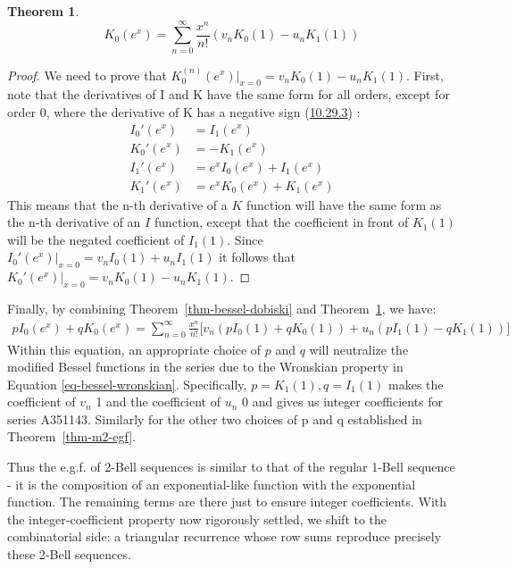 \documentclass[a4paper]{amsart}
\newtheorem{theorem}{Theorem}
\begin{document}
\begin{theorem}\label{thm-besselk-dobinski}
\[
K_0(e^x) = \sum_{n=0}^\infty \frac{x^n}{n!}(v_n K_0(1) - u_n K_1(1))
\]
\end{theorem}

\begin{proof}
We need to prove that $K_0^{(n)}(e^x)|_{x=0} = v_n K_0(1)-u_n K_1(1)$. First, note that the derivatives of I and K have the same form for all orders, except for order 0, where the derivative of K has a negative sign (\href{https://dlmf.nist.gov/10.29.E3}{10.29.3}) \cite{NIST:DLMF}:
\[
\begin{aligned}
I_0'(e^x) &= I_1(e^x) \\
K_0'(e^x) &= -K_1(e^x) \\
I_1'(e^x) &= e^x I_0(e^x) + I_1(e^x) \\
K_1'(e^x) &= e^x K_0(e^x) + K_1(e^x)
\end{aligned}
\]
This means that the n-th derivative of a $K$ function will have the same form as the n-th derivative of an $I$ function, except that the coefficient in front of $K_1(1)$ will be the negated coefficient of $I_1(1)$. Since $I_0'(e^x)|_{x=0} = v_n I_0(1) + u_n I_1(1)$ it follows that $K_0'(e^x)|_{x=0} = v_n K_0(1)-u_n K_1(1)$.
\end{proof}

Finally, by combining Theorem~\ref{thm-bessel-dobiski} and Theorem~\ref{thm-besselk-dobinski}, we have:
\[
\begin{aligned}
p I_0(e^x) + q K_0(e^x) = \sum_{n=0}^\infty \frac{x^n}{n!} \bigg[ v_n (p I_0(1) + q K_0(1)) + u_n (p I_1(1) - q K_1(1))\bigg]
\end{aligned}
\]
Within this equation, an appropriate choice of $p$ and $q$ will neutralize the modified Bessel functions in the series due to the Wronskian property in Equation \eqref{eq-bessel-wronskian}. Specifically, $p = K_1(1), q = I_1(1)$ makes the coefficient of $v_n$ 1 and the coefficient of $u_n$ 0 and gives us integer coefficients for series A351143. Similarly for the other two choices of p and q established in Theorem~\ref{thm-m2-egf}.

Thus the e.g.f. of 2-Bell sequences is similar to that of the regular 1-Bell sequence - it is the composition of an exponential-like function with the exponential function. The remaining terms are there just to ensure integer coefficients. With the integer‑coefficient property now rigorously settled, we shift to the combinatorial side: a triangular recurrence whose row sums reproduce precisely these 2‑Bell sequences.
\end{document}
